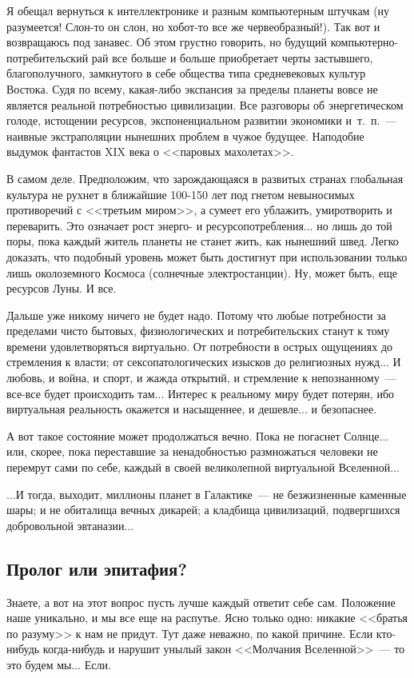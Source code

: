 \documentclass{scrbook}
\newcommand{\flqq}{<<}
\newcommand{\frqq}{>>}
\newcommand{\mdash}{~--- }
\newcommand{\essaysection}[1]{\subsection*{#1}\nopagebreak}
\begin{document}
Я обещал вернуться к интеллектронике и разным компьютерным штучкам (ну разумеется! Слон-то он слон, но хобот-то все же червеобразный!). Так вот и возвращаюсь под занавес. Об этом грустно говорить, но будущий компьютерно-потребительский рай все больше и больше приобретает черты застывшего, благополучного, замкнутого в себе общества типа средневековых культур Востока. Судя по всему, какая-либо экспансия за пределы планеты вовсе не является реальной потребностью цивилизации. Все разговоры об энергетическом голоде, истощении ресурсов, экспоненциальном развитии экономики и~т.~п.{\mdash}наивные экстраполяции нынешних проблем в чужое будущее. Наподобие выдумок фантастов XIX века о {\flqq}паровых махолетах{\frqq}.

В самом деле. Предположим, что зарождающаяся в развитых странах глобальная культура не рухнет в ближайшие 100-150 лет под гнетом невыносимых противоречий с {\flqq}третьим миром{\frqq}, а сумеет его ублажить, умиротворить и переварить. Это означает рост энерго- и ресурсопотребления... но лишь до той поры, пока каждый житель планеты не станет жить, как нынешний швед. Легко доказать, что подобный уровень может быть достигнут при использовании только лишь околоземного Космоса (солнечные электростанции). Ну, может быть, еще ресурсов Луны. И все.

Дальше уже никому ничего не будет надо. Потому что любые потребности за пределами чисто бытовых, физиологических и потребительских станут к тому времени удовлетворяться виртуально. От потребности в острых ощущениях до стремления к власти; от сексопатологических изысков до религиозных нужд... И любовь, и война, и спорт, и жажда открытий, и стремление к непознанному{\mdash}все-все будет происходить там... Интерес к реальному миру будет потерян, ибо виртуальная реальность окажется и насыщеннее, и дешевле... и безопаснее.

А вот такое состояние может продолжаться вечно. Пока не погаснет Солнце... или, скорее, пока переставшие за ненадобностью размножаться человеки не перемрут сами по себе, каждый в своей великолепной виртуальной Вселенной...

...И тогда, выходит, миллионы планет в Галактике{\mdash}не безжизненные каменные шары; и не обиталища вечных дикарей; а кладбища цивилизаций, подвергшихся добровольной эвтаназии...

\essaysection{Пролог или эпитафия?}

Знаете, а вот на этот вопрос пусть лучше каждый ответит себе сам. Положение наше уникально, и мы все еще на распутье. Ясно только одно: никакие {\flqq}братья по разуму{\frqq} к нам не придут. Тут даже неважно, по какой причине. Если кто-нибудь когда-нибудь и нарушит унылый закон {\flqq}Молчания Вселенной{\frqq}{\mdash}то это будем мы... Если.
\end{document}
